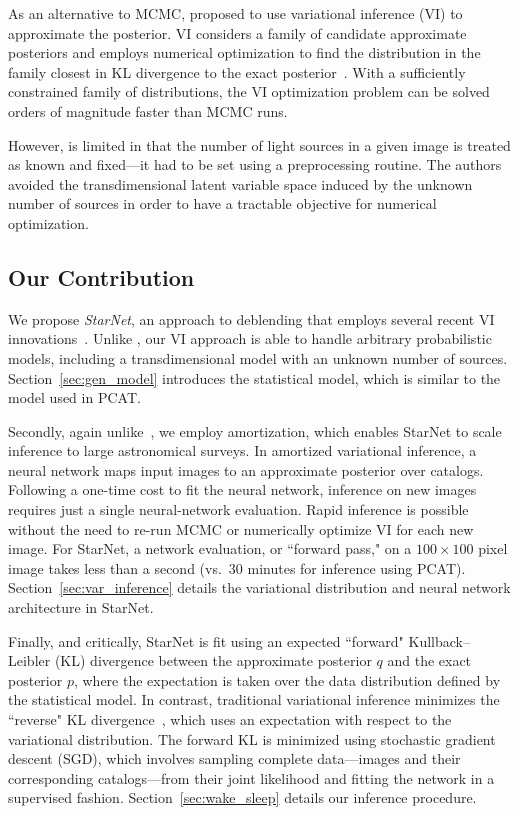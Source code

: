 As an alternative to MCMC, \cite{regier2019_celeste} proposed to use variational inference (VI)
to approximate the posterior.
VI considers a family of candidate approximate posteriors and employs numerical optimization to find the distribution in the family closest
in KL divergence to the exact posterior~\citep{Jordan_intro_vi, Wainwrite_graph_models_vi, Blei_2017_vi_review}.
With a sufficiently constrained family of distributions, the VI optimization problem can be solved orders of magnitude faster than MCMC runs.

However, \cite{regier2019_celeste} is limited in that the number of light sources in a given image is treated as known and fixed---it had to be set using a preprocessing routine.
The authors avoided the transdimensional latent variable space induced by
the unknown number of sources
in order to have a tractable objective for numerical optimization.

\bigbreak

\subsection{Our Contribution}

\nopagebreak[4]

We propose {\itshape StarNet}, an approach to deblending that employs several recent VI innovations~\citep{zhang2019advances,le2020revisiting}.
Unlike \cite{regier2019_celeste}, our VI approach is able to handle arbitrary probabilistic models, including a transdimensional model with an unknown number of sources. Section~\ref{sec:gen_model} introduces the statistical model, which is similar to the model used in PCAT.

Secondly, again unlike~\cite{regier2019_celeste},
we employ amortization, which enables StarNet to scale inference to large astronomical surveys.
In amortized variational inference, a neural network maps input images to an approximate posterior over catalogs.
Following a one-time cost to fit the neural network, inference
on new images requires just a single neural-network evaluation.
Rapid inference is possible without the need to re-run MCMC or numerically optimize VI for each new image.
For StarNet, a network evaluation, or ``forward pass," on
a $100 \times 100$ pixel image takes less than a second (vs.~30 minutes for inference using PCAT).
Section~\ref{sec:var_inference} details the variational distribution and neural network architecture in StarNet.

Finally, and critically, StarNet is fit using an expected
``forward" Kullback–Leibler (KL) divergence
between the approximate posterior $q$ and the exact posterior $p$,
where the expectation is taken over the data distribution defined by the statistical model. 
In contrast, traditional variational inference minimizes the ``reverse"
KL divergence~\citep{bishop2006pattern}, 
which uses an expectation with respect to the variational distribution. 
The forward KL is minimized using stochastic gradient descent (SGD),
which involves sampling complete data---images and their corresponding catalogs---from
their joint likelihood and fitting the network in a supervised fashion.
Section~\ref{sec:wake_sleep} details our inference procedure.

